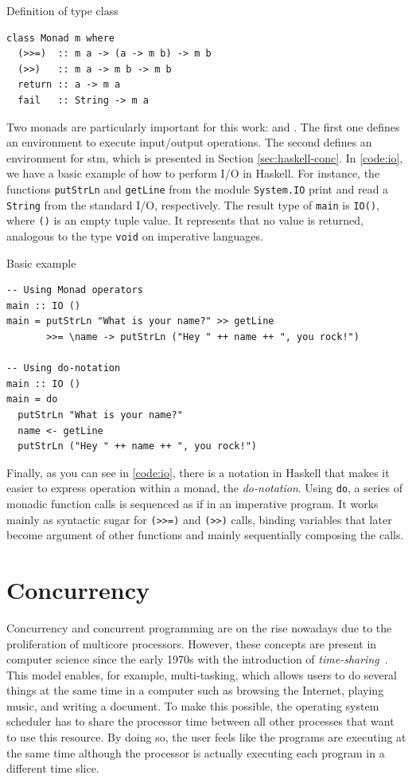 \begin{listing}
  \caption{Definition of type class \Monad}
  \begin{verbatim}
class Monad m where
  (>>=)  :: m a -> (a -> m b) -> m b
  (>>)   :: m a -> m b -> m b
  return :: a -> m a
  fail   :: String -> m a
  \end{verbatim}
  \label{code:monad}
\end{listing}

Two monads are particularly important for this work: \IO and \STM. The first one defines an environment to execute input/output operations. The second defines an environment for \acl{stm}, which is presented in Section \ref{sec:haskell-conc}. In \autoref{code:io}, we have a basic example of how to perform I/O in Haskell. For instance, the functions \texttt{putStrLn} and \texttt{getLine} from the module \texttt{System.IO} print and read a \texttt{String} from the standard I/O, respectively. The result type of \texttt{main} is \texttt{IO()}, where \texttt{()} is an empty tuple value. It represents that no value is returned, analogous to the type \texttt{void} on imperative languages.

\begin{listing}
  \caption{Basic \IO example}
  \begin{verbatim}
-- Using Monad operators
main :: IO ()
main = putStrLn "What is your name?" >> getLine
       >>= \name -> putStrLn ("Hey " ++ name ++ ", you rock!")

-- Using do-notation
main :: IO ()
main = do
  putStrLn "What is your name?"
  name <- getLine
  putStrLn ("Hey " ++ name ++ ", you rock!")
  \end{verbatim}
  \label{code:io}
\end{listing}

Finally, as you can see in \autoref{code:io}, there is a notation in Haskell that makes it easier to express operation within a monad, the \emph{do-notation}. Using \texttt{do}, a series of monadic function calls is sequenced as if in an imperative program. It works mainly as syntactic sugar for \texttt{(>{}>=)} and \texttt{(>{}>)} calls, binding variables that later become argument of other functions and mainly sequentially composing the calls.


\section{Concurrency}\label{sec:conc}
Concurrency and concurrent programming are on the rise nowadays due to the proliferation of multicore processors. However, these concepts are present in computer science since the early 1970s with the introduction of \emph{time-sharing}~\cite{lea:2006}. This model enables, for example, multi-tasking, which allows users to do several things at the same time in a computer such as browsing the Internet, playing music, and writing a document. To make this possible, the operating system scheduler has to share the processor time between all other processes that want to use this resource. By doing so, the user feels like the programs are executing at the same time although the processor is actually executing each program in a different time slice.

